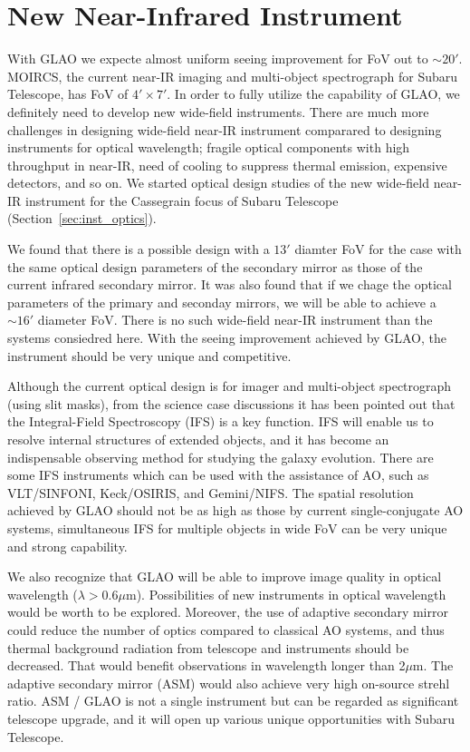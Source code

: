 \section{New Near-Infrared Instrument}

With GLAO we expecte almost uniform seeing improvement for FoV out to
$\sim 20'$. MOIRCS, the current near-IR imaging and multi-object
spectrograph for Subaru Telescope, has FoV of $4' \times 7'$. In order
to fully utilize the capability of GLAO, we definitely need to develop
new wide-field instruments. There are much more challenges in designing 
wide-field near-IR instrument comparared to designing instruments for
optical wavelength; fragile optical components with high throughput in
near-IR, need of cooling to suppress thermal emission, expensive
detectors, and so on. We started optical design studies of the new
wide-field near-IR instrument for the Cassegrain focus of Subaru
Telescope (Section~\ref{sec:inst_optics}).

We found that there is a possible design with a $13'$ diamter FoV for
the case with the same optical design parameters of the secondary
mirror as those of the current infrared secondary mirror. It was also 
found that if we chage the optical parameters of the primary and 
seconday mirrors, we will be able to achieve a $\sim 16'$ diameter
FoV.
There is no such wide-field near-IR instrument than the systems
consiedred here. With the seeing improvement achieved by GLAO, the
instrument should be very unique and competitive.

Although the current optical design is for imager and multi-object
spectrograph (using slit masks), 
from the science case discussions it has been pointed out that the 
Integral-Field Spectroscopy (IFS) is a key function. IFS will enable us
to resolve internal structures of extended objects, and it has become an
indispensable observing method for studying the galaxy evolution.
There are some IFS instruments which can be used with the assistance of
AO, such as VLT/SINFONI, Keck/OSIRIS, and Gemini/NIFS.
The spatial resolution achieved by GLAO should not be as high as those
by current single-conjugate AO systems, simultaneous IFS for multiple
objects in wide FoV can be very unique and strong capability.

We also recognize that GLAO will be able to improve image quality in
optical wavelength ($\lambda > 0.6 \mu$m). Possibilities of new
instruments in optical wavelength would be worth to be
explored. Moreover, the use of adaptive secondary mirror could reduce
the number of optics compared to classical AO systems, and thus thermal
background radiation from telescope and instruments should be
decreased. That would benefit observations in wavelength longer than
2$\mu$m. The adaptive secondary mirror (ASM) would also achieve very
high on-source strehl ratio. ASM / GLAO is not a single instrument but
can be regarded as significant telescope upgrade, and it will open up
various unique opportunities with Subaru Telescope.

